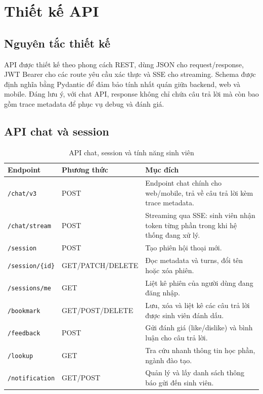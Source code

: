 \documentclass[../DoAn.tex]{subfiles}
\begin{document}
\section{Thiết kế API}

\subsection{Nguyên tắc thiết kế}

API được thiết kế theo phong cách REST, dùng JSON cho request/response, JWT
Bearer cho các route yêu cầu xác thực và SSE cho streaming. Schema được định
nghĩa bằng Pydantic để đảm bảo tính nhất quán giữa backend, web và mobile.
Đáng lưu ý, với chat API, response không chỉ chứa câu trả lời mà còn bao gồm
trace metadata để phục vụ debug và đánh giá.

\subsection{API chat và session}

\begin{table}[H]
\centering
\small
\begin{tabular}{|p{3.8cm}|p{2.4cm}|p{7.5cm}|}
\hline
\textbf{Endpoint} & \textbf{Phương thức} & \textbf{Mục đích} \\
\hline
\texttt{/chat/v3} & POST & Endpoint chat chính cho web/mobile, trả về câu trả
lời kèm trace metadata. \\
\hline
\texttt{/chat/stream} & POST & Streaming qua SSE: sinh viên nhận token từng
phần trong khi hệ thống đang xử lý. \\
\hline
\texttt{/session} & POST & Tạo phiên hội thoại mới. \\
\hline
\texttt{/session/\{id\}} & GET/PATCH/DELETE & Đọc metadata và turns, đổi tên
hoặc xóa phiên. \\
\hline
\texttt{/sessions/me} & GET & Liệt kê phiên của người dùng đang đăng nhập. \\
\hline
\texttt{/bookmark} & GET/POST/DELETE & Lưu, xóa và liệt kê các câu trả lời
được sinh viên đánh dấu. \\
\hline
\texttt{/feedback} & POST & Gửi đánh giá (like/dislike) và bình luận cho
câu trả lời. \\
\hline
\texttt{/lookup} & GET & Tra cứu nhanh thông tin học phần, ngành đào tạo. \\
\hline
\texttt{/notification} & GET/POST & Quản lý và lấy danh sách thông báo gửi
đến sinh viên. \\
\hline
\end{tabular}
\caption{API chat, session và tính năng sinh viên}
\label{tab:ch4-api-chat}
\end{table}
\end{document}
